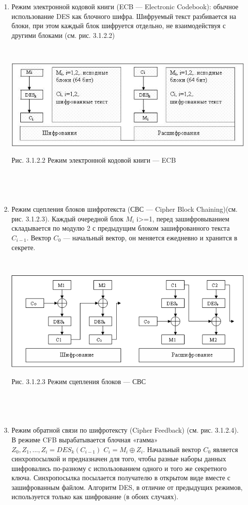 \documentclass[a4paper]{report}
\begin{document}
\begin{enumerate}
\item Режим электронной кодовой книги (ECB — Electronic Codebook): обычное использование DES как блочного шифра. Шифруемый текст разбивается на блоки, при этом каждый блок шифруется отдельно, не взаимодействуя с другими блоками (см. рис. 3.1.2.2)

~

\includegraphics[scale=1.2]{ECB1}
{\centering\caption{\newline Рис. 3.1.2.2 Режим электронной кодовой книги — ECB}\\}

~


\item Режим сцепления блоков шифротекста (СВС — Cipher Block Chaining)(см. рис. 3.1.2.3). Каждый очередной блок $M_{i}$ i>=1, перед зашифровыванием складывается по модулю 2 с предыдущим блоком зашифрованного текста $C_{i-1}$. Вектор $C_{0}$ — начальный вектор, он меняется ежедневно и хранится в секрете.

~

\includegraphics[scale=1.1]{CBC}
{\centering\caption{\newline Рис. 3.1.2.3 Режим сцепления блоков — СВС}\\}

~

\item Режим обратной связи по шифротексту (Cipher Feedback) (см. рис. 3.1.2.4). В режиме CFB вырабатывается блочная «гамма» $Z_{0},Z_{1},...,Z_{i}=DES_{k}(C_{i-1})$ $C_{i} = M_{i}\oplus Z_{i}$. Начальный вектор $C_{0}$ является синхропосылкой и предназначен для того, чтобы разные наборы данных шифровались по-разному с использованием одного и того же секретного ключа. Синхропосылка посылается получателю в открытом виде вместе с зашифрованным файлом. Алгоритм DES, в отличие от предыдущих режимов, используется только как шифрование (в обоих случаях).


\end{enumerate}
\end{document}
